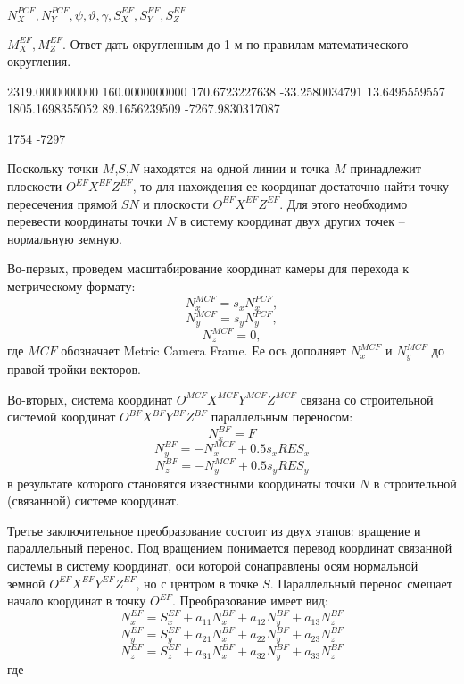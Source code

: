 
$N_X^{PCF}, N_Y^{PCF}, \psi, \vartheta, \gamma, S_X^{EF}, S_Y^{EF}, S_Z^{EF}$ 

\outputfmtSection

$M_X^{EF}, M_Z^{EF}$. Ответ дать округленным до 1 м по правилам математического округления.


\begin{myverbbox}[\small]{\vinput}
    2319.0000000000 160.0000000000 170.6723227638 -33.2580034791 
    13.6495559557 1805.1698355052 89.1656239509 -7267.9830317087
\end{myverbbox}
\begin{myverbbox}[\small]{\voutput}
    1754 -7297
\end{myverbbox}

\solutionSection

Поскольку точки $M$,$S$,$N$ находятся на одной линии и точка $M$ принадлежит плоскости 
$O^{EF} X^{EF} Z^{EF}$, то для нахождения ее координат достаточно найти точку пересечения прямой $SN$ и плоскости 
$O^{EF} X^{EF} Z^{EF}$. Для этого необходимо перевести координаты точки $N$ в систему координат двух других точек – 
нормальную земную.

Во-первых, проведем масштабирование координат камеры для перехода к метрическому формату:
$$N_x^{MCF}=s_x N_x^{PCF},$$
$$N_y^{MCF}=s_y N_y^{PCF},$$
$$N_z^{MCF}=0,$$
где $MCF$  обозначает Metric Camera Frame. Ее ось дополняет $N_x^{MCF}$ и $N_y^{MCF}$ до правой тройки векторов.

Во-вторых, система координат $O^{MCF} X^{MCF} Y^{MCF} Z^{MCF}$ связана со строительной системой координат 
$O^{BF} X^{BF} Y^{BF} Z^{BF}$ параллельным переносом:
$$N_x^{BF}=F$$
$$N_y^{BF}=-N_x^{MCF}+0.5s_x RES_x$$
$$N_z^{BF}=-N_y^{MCF}+0.5s_y RES_y$$
в результате которого становятся известными координаты точки $N$ в строительной (связанной) системе координат.

Третье заключительное преобразование состоит из двух этапов: вращение и параллельный перенос. 
Под вращением понимается перевод координат связанной системы в систему координат, оси которой 
сонаправлены осям нормальной земной $O^{EF} X^{EF} Y^{EF} Z^{EF}$, но с центром в точке $S$. 
Параллельный перенос смещает начало координат в точку $O^{EF}$. Преобразование имеет вид:
$$N_x^{EF}=S_x^{EF}+a_{11} N_x^{BF}+a_{12} N_y^{BF}+a_{13} N_z^{BF}$$
$$N_y^{EF}=S_y^{EF}+a_{21} N_x^{BF}+a_{22} N_y^{BF}+a_{23} N_z^{BF}$$
$$N_z^{EF}=S_z^{EF}+a_{31} N_x^{BF}+a_{32} N_y^{BF}+a_{33} N_z^{BF}$$
где

